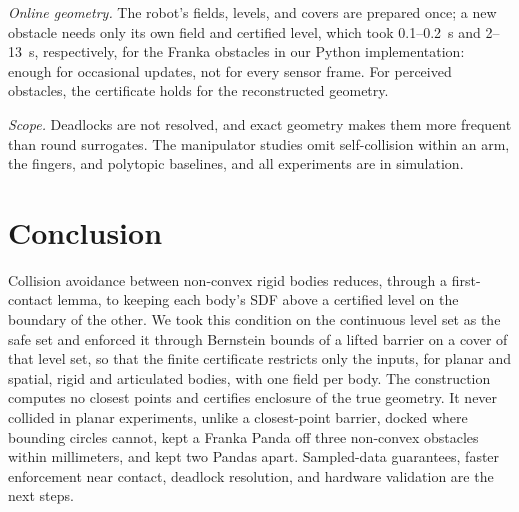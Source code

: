 \documentclass[journal]{IEEEtran}
\theoremstyle{definition}
\begin{document}
\emph{Online geometry.} The robot's fields, levels, and covers are prepared once; a new obstacle needs
only its own field and certified level, which took 0.1--0.2~s and 2--13~s, respectively, for the
Franka obstacles in our Python implementation: enough for occasional updates, not for every sensor
frame. For perceived obstacles, the certificate holds for the reconstructed geometry.

\emph{Scope.} Deadlocks are not resolved, and exact geometry makes them more frequent than round
surrogates. The manipulator studies omit self-collision within an arm, the fingers, and polytopic
baselines, and all experiments are in simulation.

\section{Conclusion}\label{sec:concl}
Collision avoidance between non-convex rigid bodies reduces, through a first-contact lemma, to
keeping each body's SDF above a certified level on the boundary of the other. We took this condition
on the continuous level set as the safe set and enforced it through Bernstein bounds of a lifted
barrier on a cover of that level set, so that the finite certificate restricts only the inputs, for
planar and spatial, rigid and articulated bodies, with one field per body. The construction computes
no closest points and certifies enclosure of the true geometry. It never collided in planar
experiments, unlike a closest-point barrier, docked where bounding circles cannot, kept a Franka
Panda off three non-convex obstacles within millimeters, and kept two Pandas apart. Sampled-data
guarantees, faster enforcement near contact, deadlock resolution, and hardware validation are the
next steps.



\end{document}
